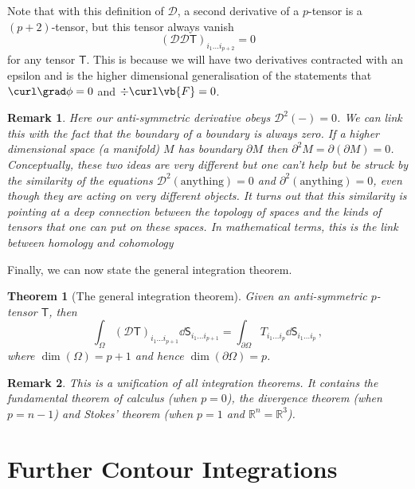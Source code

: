 \documentclass{article}
\theoremstyle{plain}\theoremheaderfont{\normalfont\itshape}\theorembodyfont{\rmfamily}\theoremseparator{.}\newtheorem*{rem}{Remark}\newtheorem*{ex}{Example}\newtheorem*{proof}{Proof}\newtheorem*{altp}{Alternative proof}
\theoremstyle{plain}\theoremheaderfont{\normalfont\bfseries}\theorembodyfont{\rmfamily}\theoremseparator{.}\newtheorem{thm}{Theorem}[section]\newtheorem{lem}[thm]{Lemma}\newtheorem{prop}[thm]{Proposition}\newtheorem*{cor}{Corollary}\newtheorem{defn}[thm]{Definition}\newtheorem{clm}[thm]{Claim}\newtheorem{clminproof}{Claim}
\theoremstyle{break}\theoremheaderfont{\normalfont\itshape}\theorembodyfont{\rmfamily}\theoremseparator{.\medskip}\newtheorem*{proofskip}{Proof}\newtheorem*{exs}{Examples}\newtheorem*{rems}{Remarks}
\theoremstyle{break}\theoremheaderfont{\normalfont\bfseries}\theorembodyfont{\rmfamily}\theoremseparator{.\medskip}\newtheorem{lemskip}[thm]{Lemma}\newtheorem{defnskip}[thm]{Definition}\newtheorem{propskip}[thm]{Proposition}\newtheorem{thmskip}[thm]{Theorem}
\numberwithin{equation}{section}
\begin{document}
	Note that with this definition of \(\mathcal{D}\), a second derivative of a \(p\)-tensor is a \((p+2)\)-tensor, but this tensor always vanish
	\[(\mathcal{DD}\mathsf{T})_{i_1\dots i_{p+2}}=0\]
	for any tensor \(\mathsf{T}\). This is because we will have two derivatives contracted with an epsilon and is the higher dimensional generalisation of the statements that \(\curl\grad\phi=0\) and \(\div\curl\vb{F}=0\).
	\begin{rem}
		Here our anti-symmetric derivative obeys \(\mathcal{D}^2(-)=0\). We can link this with the fact that the boundary of a boundary is always zero. If a higher dimensional space (a manifold) \(M\) has boundary \(\partial M\) then \(\partial^2M=\partial(\partial M)=0\). Conceptually, these two ideas are very different but one can't help but be struck by the similarity of the equations \(\mathcal{D}^2(\text{anything})=0\) and \(\partial^2(\text{anything})=0\), even though they are acting on very different objects. It turns out that this similarity is pointing at a deep connection between the topology of spaces and the kinds of tensors that one can put on these spaces. In mathematical terms, this is the link between homology and cohomology
	\end{rem}
	Finally, we can now state the general integration theorem.
	\begin{thm}[The general integration theorem]
		Given an anti-symmetric \(p\)-tensor \(\mathsf{T}\), then
		\[\int_\Omega(\mathcal{D}\mathsf{T})_{i_1\dots i_{p+1}}\dd{\mathsf{S}_{i_1\dots i_{p+1}}}=\int_{\partial\Omega}T_{i_1\dots i_p}\dd{\mathsf{S}_{i_1\dots i_p}}\,,\]
		where \(\dim(\Omega)=p+1\) and hence \(\dim(\partial\Omega)=p\).
	\end{thm}
	\begin{rem}
		This is a unification of all integration theorems. It contains the fundamental theorem of calculus (when \(p=0\)), the divergence theorem (when \(p=n-1\)) and Stokes' theorem (when \(p=1\) and \(\mathbb{R}^n=\mathbb{R}^3\)). 
	\end{rem}
	
	\newpage

	\section{Further Contour Integrations}
\end{document}
